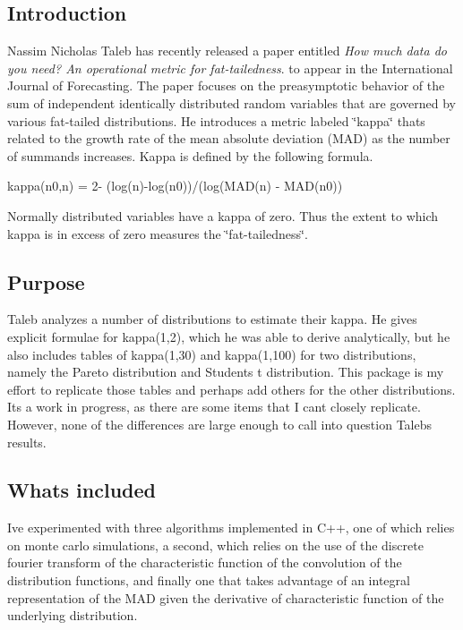 \subsection*{Introduction}

Nassim Nicholas Taleb has recently released a paper entitled {\itshape How much data do you need? An operational metric for fat-\/tailedness}. to appear in the International Journal of Forecasting. The paper focuses on the preasymptotic behavior of the sum of independent identically distributed random variables that are governed by various fat-\/tailed distributions. He introduces a metric labeled \char`\"{}kappa\char`\"{} that\textquotesingle{}s related to the growth rate of the mean absolute deviation (M\+AD) as the number of summands increases. Kappa is defined by the following formula.

kappa(n0,n) = 2-\/ (log(n)-\/log(n0))/(log(M\+A\+D(n) -\/ M\+A\+D(n0))

Normally distributed variables have a kappa of zero. Thus the extent to which kappa is in excess of zero measures the \char`\"{}fat-\/tailedness\char`\"{}.

\subsection*{Purpose}

Taleb analyzes a number of distributions to estimate their kappa. He gives explicit formulae for kappa(1,2), which he was able to derive analytically, but he also includes tables of kappa(1,30) and kappa(1,100) for two distributions, namely the Pareto distribution and Student\textquotesingle{}s t distribution. This package is my effort to replicate those tables and perhaps add others for the other distributions. It\textquotesingle{}s a work in progress, as there are some items that I can\textquotesingle{}t closely replicate. However, none of the differences are large enough to call into question Taleb\textquotesingle{}s results.

\subsection*{What\textquotesingle{}s included}

I\textquotesingle{}ve experimented with three algorithms implemented in C++, one of which relies on monte carlo simulations, a second, which relies on the use of the discrete fourier transform of the characteristic function of the convolution of the distribution functions, and finally one that takes advantage of an integral representation of the M\+AD given the derivative of characteristic function of the underlying distribution.

